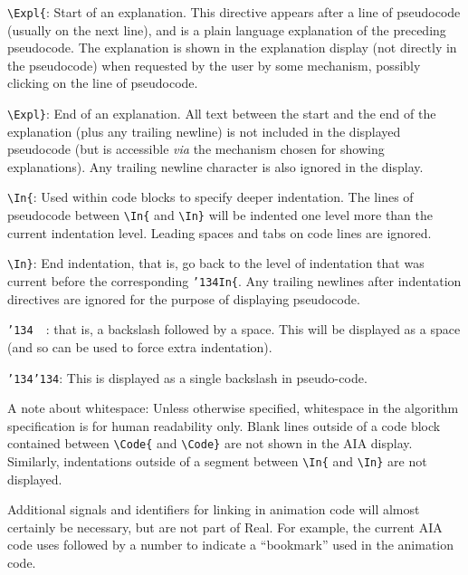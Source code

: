 \documentclass[11pt]{article}
\newcommand{\slant}{\texttt{\char'134}}        %
\begin{document}
\begin{description}
\item{\verb~\Expl{~:}
Start of an explanation. This directive appears after a line of pseudocode 
(usually on the next line), and is a plain language explanation of the 
preceding pseudocode.  
The explanation is shown in the explanation display 
(not directly in the pseudocode) when requested by the user by some mechanism, 
possibly clicking on the line of pseudocode.

\item{\verb~\Expl}~:}
End of an explanation. All text between the start and the
end of the explanation (plus any trailing newline) is not 
included in the displayed pseudocode
(but is accessible {\it via} the mechanism chosen for showing explanations).
 Any trailing newline character is also ignored in the display.

\item{\verb~\In{~:}
Used within code blocks to specify deeper indentation.
The lines of pseudocode between {\verb~\In{~} and {\verb~\In}~} will be 
indented one level more than the current indentation level. 
Leading spaces and tabs on code lines are ignored.

\item{\verb~\In}~:}
End indentation, that is, go back to the level of indentation
that was current before the corresponding 
\texttt{\slant}\verb!In{!. 
Any trailing newlines after indentation directives are ignored for 
the purpose of displaying pseudocode.

\item{\texttt{\slant}~~:}
that is, a backslash followed by a space. This will be displayed
as a space (and so can be used to force extra indentation).

\item{\texttt{\slant}\texttt{\slant}:}
This is displayed as a single backslash in pseudo-code.
\end{description}

A note about whitespace: Unless otherwise specified, whitespace in the 
algorithm specification is for human readability only. 
Blank lines outside of a code block contained between {\verb~\Code{~} 
and {\verb~\Code}~} are not shown in the AIA display.  
Similarly, indentations outside of a segment between {\verb~\In{~} and 
{\verb~\In}~} are not displayed.

Additional signals and identifiers for linking in animation code will
almost certainly be necessary, but are not part of Real. For example,
the current AIA code uses \verb@\B@ followed by a number to indicate a
``bookmark'' used in the animation code.
\end{document}
